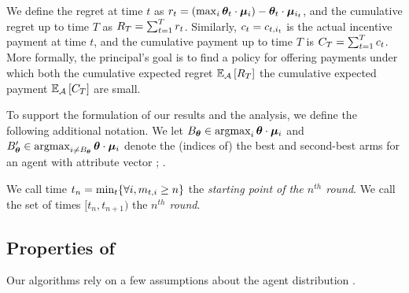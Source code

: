 We define the regret at time $t$ as
$r_{t} = (\max_{i} \bm{\theta}_{t} \cdot \bm{\mu}_{i}) - \bm{\theta}_{t} \cdot \bm{\mu}_{i_{t}}$,
and the cumulative regret up to time $T$ as
$R_{T} = \sum_{t=1}^{T} r_{t}$.
Similarly, $c_{t} = c_{t,i_{t}}$ is the actual incentive
payment at time $t$,
and the cumulative payment up to time $T$ is
$C_{T} = \sum_{t=1}^{T} c_{t}$.
More formally, the principal's goal is to find a policy
\POLICY for offering payments under which both the cumulative expected
regret
$\Expect[\POLICY]{\TotalRegret{T}}$ the cumulative expected payment
$\Expect[\POLICY]{\TotalPay{T}}$ are small.

To support the formulation of our results and the analysis,
we define the following additional notation.
We let
$B_{\bm{\theta}} \in \mathop{\mathrm{argmax}}_i \bm{\theta} \cdot \bm{\mu}_{i}$
and
$ B'_{\bm{\theta}} \in \mathop{\mathrm{argmax}}_{i \neq B_{\bm{\theta}}} \bm{\theta} \cdot \bm{\mu}_{i}$
denote the (indices of) the best and second-best arms for an agent
with attribute vector \AgV;
.

We call time $t_{n}=\min_{t}\{\forall i, m_{t,i} \geq n\}$ the
\emph{starting point of the $n^{th}$ round}.
We call the set of times $[t_{n}, t_{n+1})$ the
\emph{$n^{th}$ round}.




\subsection{Properties of \AgentDist}
Our algorithms rely on a few assumptions about the agent distribution
\AgentDist.

